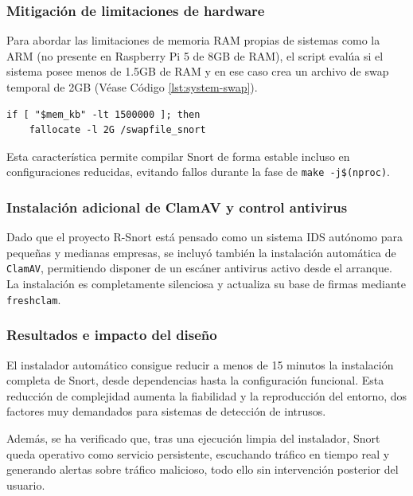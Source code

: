 \documentclass[11pt,a4paper,twoside]{report}
\begin{document}
\subsubsection{Mitigación de limitaciones de hardware}

Para abordar las limitaciones de memoria RAM propias de sistemas como la ARM (no presente en Raspberry Pi 5 de 8GB de RAM), el script evalúa si el sistema posee menos de 1.5GB de RAM y en ese caso crea un archivo de swap temporal de 2GB (Véase Código \ref{lst:system-swap}).

\begin{lstlisting}[style=commandstyle, caption={Sistema de swap.}, label=lst:system-swap]
	if [ "$mem_kb" -lt 1500000 ]; then
	fallocate -l 2G /swapfile_snort
\end{lstlisting}

Esta característica permite compilar Snort de forma estable incluso en configuraciones reducidas, evitando fallos durante la fase de \texttt{make -j\$(nproc)}.

\subsubsection{Instalación adicional de ClamAV y control antivirus}

Dado que el proyecto R-Snort está pensado como un sistema IDS autónomo para pequeñas y medianas empresas, se incluyó también la instalación automática de \texttt{ClamAV}, permitiendo disponer de un escáner antivirus activo desde el arranque. La instalación es completamente silenciosa y actualiza su base de firmas mediante \texttt{freshclam}.

\subsubsection{Resultados e impacto del diseño}

El instalador automático consigue reducir a menos de 15 minutos la instalación completa de Snort, desde dependencias hasta la configuración funcional. Esta reducción de complejidad aumenta la fiabilidad y la reproducción del entorno, dos factores muy demandados para sistemas de detección de intrusos.\newline

Además, se ha verificado que, tras una ejecución limpia del instalador, Snort queda operativo como servicio persistente, escuchando tráfico en tiempo real y generando alertas sobre tráfico malicioso, todo ello sin intervención posterior del usuario.
\end{document}

